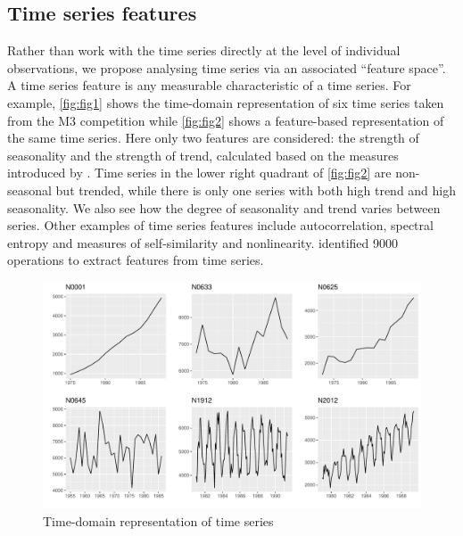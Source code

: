 \documentclass[11pt,a4paper,]{article}
\begin{document}
\hypertarget{time-series-features}{%
\subsection{Time series features}\label{time-series-features}}

Rather than work with the time series directly at the level of individual observations, we propose analysing time series via an associated ``feature space''. A time series feature is any measurable characteristic of a time series. For example, \autoref{fig:fig1} shows the time-domain representation of six time series taken from the M3 competition \autocite{makridakis2000m3} while \autoref{fig:fig2} shows a feature-based representation of the same time series. Here only two features are considered: the strength of seasonality and the strength of trend, calculated based on the measures introduced by \textcite{wang2009rule}. Time series in the lower right quadrant of \autoref{fig:fig2} are non-seasonal but trended, while there is only one series with both high trend and high seasonality. We also see how the degree of seasonality and trend varies between series. Other examples of time series features include autocorrelation, spectral entropy and measures of self-similarity and nonlinearity. \textcite{fulcher2014highly} identified 9000 operations to extract features from time series.

\begin{figure}

{\centering \includegraphics[width=\textwidth]{figure/fig1-1} 

}

\caption{Time-domain representation of time series}\label{fig:fig1}
\end{figure}
\end{document}
